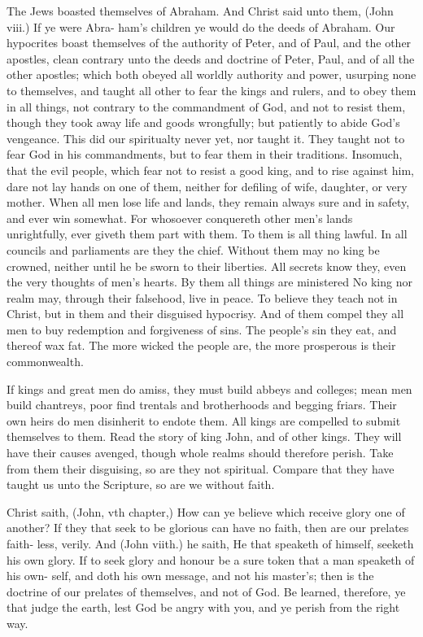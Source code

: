 \documentclass{custom}
\begin{document}
The Jews boasted themselves of Abraham. And 
Christ said unto them, (John viii.) If ye were Abra- 
ham's children ye would do the deeds of Abraham. Our 
hypocrites boast themselves of the authority of Peter, and of 
Paul, and the other apostles, clean contrary unto the deeds 
and doctrine of Peter, Paul, and of all the other apostles; 
which both obeyed all worldly authority and power, 
usurping none to themselves, and taught all other to fear 
the kings and rulers, and to obey them in all things, not 
contrary to the commandment of God, and not to resist 
them, though they took away life and goods wrongfully; 
but patiently to abide God's vengeance. This did our 
spiritualty never yet, nor taught it. They taught not to 
fear God in his commandments, but to fear them in their 
traditions. Insomuch, that the evil people, which fear 
not to resist a good king, and to rise against him, dare 
not lay hands on one of them, neither for defiling of wife, 
daughter, or very mother. When all men lose life and 
lands, they remain always sure and in safety, and ever 
win somewhat. For whosoever conquereth other men's 
lands unrightfully, ever giveth them part with them. To 
them is all thing lawful. In all councils and parliaments 
are they the chief. Without them may no king be 
crowned, neither until he be sworn to their liberties. 
All secrets know they, even the very thoughts of men's 
hearts. By them all things are ministered No king nor 
realm may, through their falsehood, live in peace. To 
believe they teach not in Christ, but in them and their 
disguised hypocrisy. And of them compel they all men 
to buy redemption and forgiveness of sins. The people's 
sin they eat, and thereof wax fat. The more wicked the 
people are, the more prosperous is their commonwealth. 

If kings and great men do amiss, they must build abbeys 
and colleges; mean men build chantreys, poor find 
trentals and brotherhoods and begging friars. Their own 
heirs do men disinherit to endote them. All kings are 
compelled to submit themselves to them. Read the story 
of king John, and of other kings. They will have their 
causes avenged, though whole realms should therefore 
perish. Take from them their disguising, so are they not 
spiritual. Compare that they have taught us unto the 
Scripture, so are we without faith. 

Christ saith, (John, vth chapter,) How can ye believe 
which receive glory one of another? If they that seek to 
be glorious can have no faith, then are our prelates faith- 
less, verily. And (John viith.) he saith, He that speaketh 
of himself, seeketh his own glory. If to seek glory and 
honour be a sure token that a man speaketh of his own- 
self, and doth his own message, and not his master's; 
then is the doctrine of our prelates of themselves, and not 
of God. Be learned, therefore, ye that judge the earth, 
lest God be angry with you, and ye perish from the right 
way. 
\end{document}
